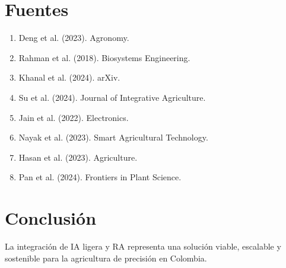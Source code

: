 \documentclass[12pt]{article}
\begin{document}
\section{Fuentes}
\begin{enumerate}
\item Deng et al. (2023). Agronomy.
\item Rahman et al. (2018). Biosystems Engineering.
\item Khanal et al. (2024). arXiv.
\item Su et al. (2024). Journal of Integrative Agriculture.
\item Jain et al. (2022). Electronics.
\item Nayak et al. (2023). Smart Agricultural Technology.
\item Hasan et al. (2023). Agriculture.
\item Pan et al. (2024). Frontiers in Plant Science.
\end{enumerate}

\section{Conclusión}
La integración de IA ligera y RA representa una solución viable, escalable y sostenible para la agricultura de precisión en Colombia.
\end{document}
